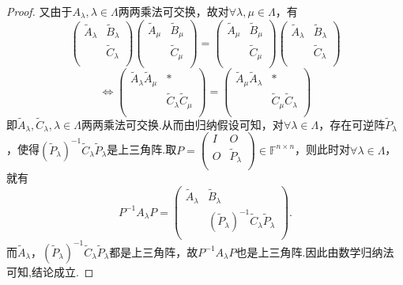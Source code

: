 \documentclass[../../main.tex]{subfiles}
\begin{document}
\begin{proof}
又由于$A_{\lambda},\lambda \in \Lambda$两两乘法可交换，故对$\forall \lambda ,\mu \in \Lambda$，有
\[
\begin{pmatrix}
\widetilde{A}_{\lambda}&		\widetilde{B}_{\lambda}\\
&		\widetilde{C}_{\lambda}\\
\end{pmatrix} \begin{pmatrix}
\widetilde{A}_{\mu}&		\widetilde{B}_{\mu}\\
&		\widetilde{C}_{\mu}\\
\end{pmatrix} =\begin{pmatrix}
\widetilde{A}_{\mu}&		\widetilde{B}_{\mu}\\
&		\widetilde{C}_{\mu}\\
\end{pmatrix} \begin{pmatrix}
\widetilde{A}_{\lambda}&		\widetilde{B}_{\lambda}\\
&		\widetilde{C}_{\lambda}\\
\end{pmatrix} 
\]
\[
\Longleftrightarrow \begin{pmatrix}
\widetilde{A}_{\lambda}\widetilde{A}_{\mu}&		*\\
&		\widetilde{C}_{\lambda}\widetilde{C}_{\mu}\\
\end{pmatrix} =\begin{pmatrix}
\widetilde{A}_{\mu}\widetilde{A}_{\lambda}&		*\\
&		\widetilde{C}_{\mu}\widetilde{C}_{\lambda}\\
\end{pmatrix} 
\]
即$\widetilde{A}_{\lambda},\widetilde{C}_{\lambda},\lambda \in \Lambda$两两乘法可交换.从而由归纳假设可知，对$\forall \lambda \in \Lambda$，存在可逆阵$\widetilde{P}_{\lambda}$，使得$(\widetilde{P}_{\lambda})^{-1}\widetilde{C}_{\lambda}\widetilde{P}_{\lambda}$是上三角阵.取$P=\begin{pmatrix}
I&		O\\
O&		\widetilde{P}_{\lambda}\\
\end{pmatrix} \in \mathbb{F} ^{n\times n}$，则此时对$\forall \lambda \in \Lambda$，就有
\[
P^{-1}A_{\lambda}P=\begin{pmatrix}
\widetilde{A}_{\lambda}&		\widetilde{B}_{\lambda}\\
&		(\widetilde{P}_{\lambda})^{-1}\widetilde{C}_{\lambda}\widetilde{P}_{\lambda}\\
\end{pmatrix}.
\]
而$\widetilde{A}_{\lambda}$，$(\widetilde{P}_{\lambda})^{-1}\widetilde{C}_{\lambda}\widetilde{P}_{\lambda}$都是上三角阵，故$P^{-1}A_{\lambda}P$也是上三角阵.因此由数学归纳法可知,结论成立.
\end{proof}
\end{document}
